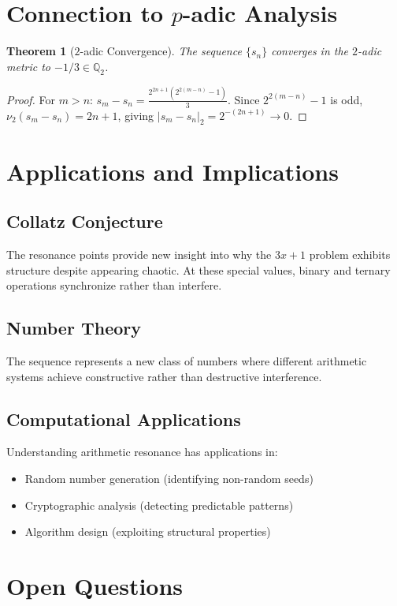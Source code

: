\documentclass[11pt]{article}
\newtheorem{theorem}{Theorem}
\theoremstyle{remark}
\begin{document}
\section{Connection to $p$-adic Analysis}

\begin{theorem}[$2$-adic Convergence]
The sequence $\{s_n\}$ converges in the $2$-adic metric to $-1/3 \in \mathbb{Q}_2$.
\end{theorem}

\begin{proof}
For $m > n$: $s_m - s_n = \frac{2^{2n+1}(2^{2(m-n)} - 1)}{3}$. Since $2^{2(m-n)} - 1$ is odd, $\nu_2(s_m - s_n) = 2n + 1$, giving $|s_m - s_n|_2 = 2^{-(2n+1)} \to 0$.
\end{proof}

\section{Applications and Implications}

\subsection{Collatz Conjecture}
The resonance points provide new insight into why the $3x+1$ problem exhibits structure despite appearing chaotic. At these special values, binary and ternary operations synchronize rather than interfere.

\subsection{Number Theory}
The sequence represents a new class of numbers where different arithmetic systems achieve constructive rather than destructive interference.

\subsection{Computational Applications}
Understanding arithmetic resonance has applications in:
\begin{itemize}
\item Random number generation (identifying non-random seeds)
\item Cryptographic analysis (detecting predictable patterns)
\item Algorithm design (exploiting structural properties)
\end{itemize}

\section{Open Questions}
\end{document}
